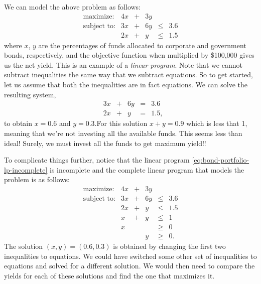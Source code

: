 \documentclass[
]{book}
\theoremstyle{definition}
\theoremstyle{definition}
\theoremstyle{definition}
\theoremstyle{definition}
\theoremstyle{remark}
\begin{document}
We can model the above problem as follows:
\begin{equation}
  \begin{array}{rrrrrr}
  \mbox{maximize:} & 4x & + & 3y \\
  \mbox{subject to:}
    & 3x & + & 6y & \le & 3.6 \\
    & 2x & + & y & \le & 1.5 
  \end{array}
  \label{eq:bond-portfolio-lp-incomplete}
\end{equation}
where \(x\), \(y\) are the percentages of funds allocated to corporate and government bonds, respectively, and the objective function when multiplied by \$100,000 gives us the net yield. This is an example of a \emph{linear program}.
Note that we cannot subtract inequalities the same way that we subtract equations. So to get started, let us assume that both the inequalities are in fact equations. We can solve the resulting system,
\begin{equation*}
  \begin{array}{rrrrrl}
    & 3x & + & 6y & = & 3.6 \\
    & 2x & + & y & = & 1.5,
  \end{array}
\end{equation*}
to obtain \(x = 0.6\) and \(y = 0.3\).For this solution \(x + y = 0.9\) which is less that 1, meaning that we're not investing all the available funds.
This seems less than ideal! Surely, we must invest all the funds to get maximum yield!!

To complicate things further, notice that the linear program \eqref{eq:bond-portfolio-lp-incomplete} is incomplete and the complete linear program that models the problem is as follows:
\begin{equation}
  \begin{array}{rrrrrl}
  \mbox{maximize:} & 4x & + & 3y \\
  \mbox{subject to:}
    & 3x & + & 6y & \le & 3.6 \\
    & 2x & + & y & \le & 1.5 \\
    & x & + & y & \le & 1 \\
    & x &  &  & \ge & 0 \\
    &   &  & y & \ge & 0.
  \end{array}
  \label{eq:bond-portfolio-lp}
\end{equation}
The solution \((x, y) = (0.6, 0.3)\) is obtained by changing the first two inequalities to equations. We could have switched some other set of inequalities to equations and solved for a different solution. We would then need to compare the yields for each of these solutions and find the one that maximizes it.
\end{document}
